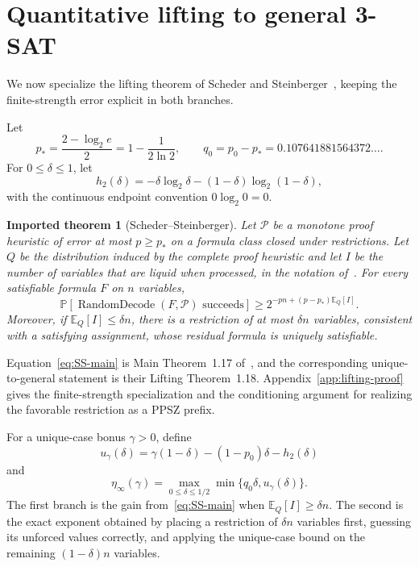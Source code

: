 \documentclass[11pt]{article}
\newtheorem{importedtheorem}[theorem]{Imported theorem}
\newcommand{\hbin}{h_2}
\newcommand{\E}{\mathbb E}
\newcommand{\Prb}{\mathbb P}
\begin{document}
\section{Quantitative lifting to general 3-SAT}\label{sec:lifting}

We now specialize the lifting theorem of Scheder and Steinberger~\cite{SchederSteinberger}, keeping the finite-strength error explicit in both branches.

Let
\begin{equation}\label{eq:pstar-q0}
 p_*=\frac{2-\log_2 e}{2}
 =1-\frac{1}{2\ln2},
 \qquad
 q_0=p_0-p_*
 =0.107641881564372\ldots.
\end{equation}
For $0\le\delta\le1$, let
\[
 \hbin(\delta)
 =-\delta\log_2\delta-(1-\delta)\log_2(1-\delta),
\]
with the continuous endpoint convention $0\log_2 0=0$.

\begin{importedtheorem}[Scheder--Steinberger]\label{thm:SS-imported}
Let $\mathcal P$ be a monotone proof heuristic of error at most $p\ge p_*$ on a formula class closed under restrictions.  Let $Q$ be the distribution induced by the complete proof heuristic and let $I$ be the number of variables that are liquid when processed, in the notation of~\cite{SchederSteinberger}.  For every satisfiable formula $F$ on $n$ variables,
\begin{equation}\label{eq:SS-main}
 \Prb[\operatorname{RandomDecode}(F,\mathcal P)\text{ succeeds}]
 \ge
 2^{-pn+(p-p_*)\E_Q[I]}.
\end{equation}
Moreover, if $\E_Q[I]\le\delta n$, there is a restriction of at most $\delta n$ variables, consistent with a satisfying assignment, whose residual formula is uniquely satisfiable.
\end{importedtheorem}

Equation~\eqref{eq:SS-main} is Main Theorem~1.17 of~\cite{SchederSteinberger}, and the corresponding unique-to-general statement is their Lifting Theorem~1.18.  Appendix~\ref{app:lifting-proof} gives the finite-strength specialization and the conditioning argument for realizing the favorable restriction as a PPSZ prefix.

For a unique-case bonus $\gamma>0$, define
\begin{equation}\label{eq:u-gamma}
 u_\gamma(\delta)
 =\gamma(1-\delta)-(1-p_0)\delta-\hbin(\delta)
\end{equation}
and
\begin{equation}\label{eq:eta-infty-def}
 \eta_\infty(\gamma)
 =\max_{0\le\delta\le1/2}
 \min\{q_0\delta,u_\gamma(\delta)\}.
\end{equation}
The first branch is the gain from~\eqref{eq:SS-main} when $\E_Q[I]\ge\delta n$.  The second is the exact exponent obtained by placing a restriction of $\delta n$ variables first, guessing its unforced values correctly, and applying the unique-case bound on the remaining $(1-\delta)n$ variables.
\end{document}
